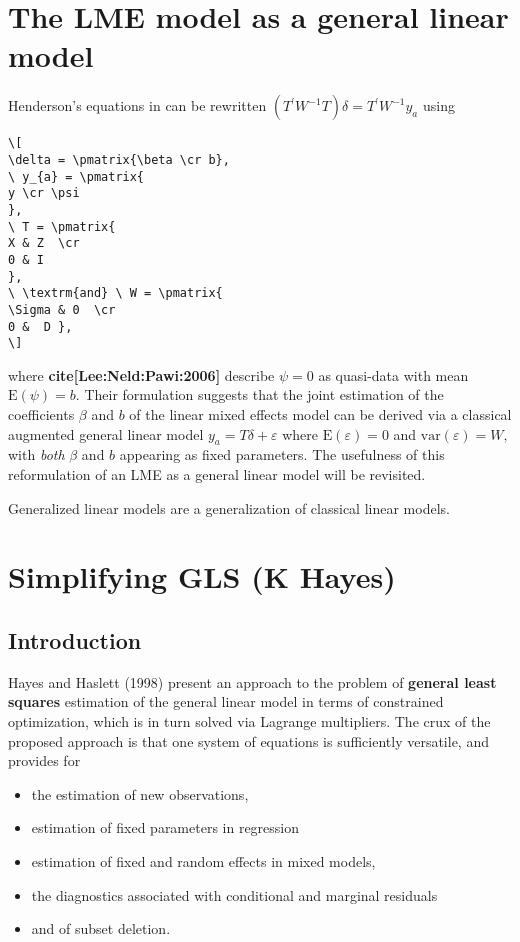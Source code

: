 \documentclass[12pt, a4paper]{article}
\begin{document}
\section{The LME model as a general linear model} %
Henderson's equations in %
can be rewritten $( T^\prime W^{-1} T ) \delta = T^\prime W^{-1} y_{a} $ using
\begin{verbatim}
\[
\delta = \pmatrix{\beta \cr b},
\ y_{a} = \pmatrix{
y \cr \psi
},
\ T = \pmatrix{
X & Z  \cr
0 & I
},
\ \textrm{and} \ W = \pmatrix{
\Sigma & 0  \cr
0 &  D },
\]
\end{verbatim}
where \textbf{cite[Lee:Neld:Pawi:2006]} describe $\psi = 0$ as quasi-data with mean $\mathrm{E}(\psi) = b.$ Their formulation suggests that the joint estimation of the coefficients $\beta$ and $b$ of the linear mixed effects model can be derived via a classical augmented general linear model $y_{a} = T\delta + \varepsilon$ where $\mathrm{E}(\varepsilon) = 0$ and $\mathrm{var}(\varepsilon) = W,$ with \emph{both} $\beta$ and $b$ appearing as fixed parameters. The usefulness of this reformulation of an LME as a general linear model will be revisited.







Generalized linear models are a generalization of classical linear  models.

\section{Simplifying GLS (K Hayes)}

\subsection{Introduction}

Hayes and Haslett (1998) present an approach to the problem of \textbf{general least squares} estimation of the general linear model in terms of constrained optimization, which is in turn solved via Lagrange multipliers. The crux of the proposed approach is that one system of equations is sufficiently versatile, and provides for \begin{itemize} \item the estimation of new observations, \item estimation of fixed parameters in regression \item estimation of fixed and random effects in mixed models,\item the diagnostics associated with conditional and marginal residuals \item and of subset deletion. \end{itemize}
\end{document}
